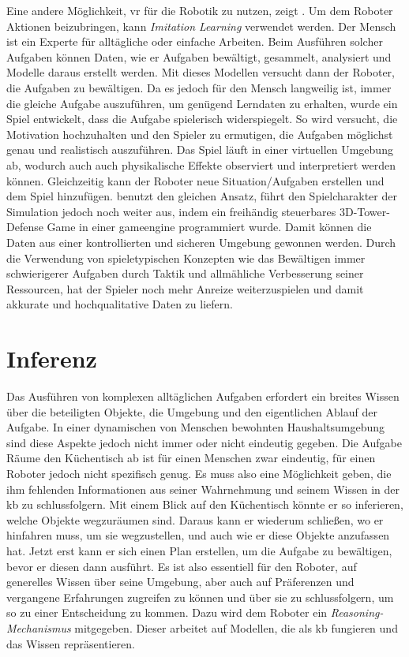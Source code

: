 Eine andere Möglichkeit, \gls{vr} für die Robotik zu nutzen, zeigt \cite{imitationLearning2}. Um dem Roboter Aktionen beizubringen, kann \textit{Imitation Learning} verwendet werden. Der Mensch ist ein Experte für alltägliche oder einfache Arbeiten. Beim Ausführen solcher Aufgaben können Daten, wie er Aufgaben bewältigt, gesammelt, analysiert und Modelle daraus erstellt werden. Mit dieses Modellen versucht dann der Roboter, die Aufgaben zu bewältigen. Da es jedoch für den Mensch langweilig ist, immer die gleiche Aufgabe auszuführen, um genügend Lerndaten zu erhalten, wurde ein Spiel entwickelt, dass die Aufgabe spielerisch widerspiegelt. So wird versucht, die Motivation hochzuhalten und den Spieler zu ermutigen, die Aufgaben möglichst genau und realistisch auszuführen. Das Spiel läuft in einer virtuellen Umgebung ab, wodurch auch auch physikalische Effekte observiert und interpretiert werden können. Gleichzeitig kann der Roboter neue Situation/Aufgaben erstellen und dem Spiel hinzufügen. \newline
\cite{imitationLearning1} benutzt den gleichen Ansatz, führt den Spielcharakter der Simulation jedoch noch weiter aus, indem ein freihändig steuerbares 3D-Tower-Defense Game in einer \gls{gameengine} programmiert wurde. Damit können die Daten aus einer kontrollierten und sicheren Umgebung gewonnen werden. Durch die Verwendung von spieletypischen Konzepten wie das Bewältigen immer schwierigerer Aufgaben durch Taktik und allmähliche Verbesserung seiner Ressourcen, hat der Spieler noch mehr Anreize weiterzuspielen und damit akkurate und hochqualitative Daten zu liefern. 


\section{Inferenz}

Das Ausführen von komplexen alltäglichen Aufgaben erfordert ein breites Wissen über die beteiligten Objekte, die Umgebung und den eigentlichen Ablauf der Aufgabe. In einer dynamischen von Menschen bewohnten Haushaltsumgebung sind diese Aspekte jedoch nicht immer oder nicht eindeutig gegeben. Die Aufgabe \glqq Räume den Küchentisch ab\grqq \xspace ist für einen Menschen zwar eindeutig, für einen Roboter jedoch nicht spezifisch genug. Es muss also eine Möglichkeit geben, die ihm fehlenden Informationen aus seiner Wahrnehmung und seinem  Wissen in der \gls{kb} zu schlussfolgern. Mit einem Blick auf den Küchentisch könnte er so inferieren, welche Objekte wegzuräumen sind. Daraus kann er wiederum schließen, wo er hinfahren muss, um sie wegzustellen, und auch wie er diese Objekte anzufassen hat. Jetzt erst kann er sich einen Plan erstellen, um die Aufgabe zu bewältigen, bevor er diesen dann ausführt. Es ist also essentiell für den Roboter, auf generelles Wissen über seine Umgebung, aber auch auf Präferenzen und vergangene Erfahrungen zugreifen zu können und über sie zu schlussfolgern, um so zu einer Entscheidung zu kommen. Dazu wird dem Roboter ein \textit{Reasoning-Mechanismus} mitgegeben. Dieser arbeitet auf Modellen, die als \gls{kb} fungieren und das Wissen repräsentieren. \cite{Tenorth2010}    \par

